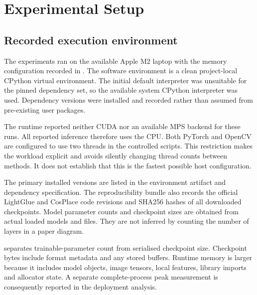 \chapter{Experimental Setup}\label{ch:setup}
\section{Recorded execution environment}
The experiments ran on the available Apple M2 laptop with the memory configuration recorded in . The software environment is a clean project-local CPython virtual environment. The initial default interpreter was unsuitable for the pinned dependency set, so the available system CPython interpreter was used. Dependency versions were installed and recorded rather than assumed from pre-existing user packages.

The runtime reported neither CUDA nor an available MPS backend for these runs. All reported inference therefore uses the CPU. Both PyTorch and OpenCV are configured to use two threads in the controlled scripts. This restriction makes the workload explicit and avoids silently changing thread counts between methods. It does not establish that this is the fastest possible host configuration.

The primary installed versions are listed in the environment artifact and dependency specification. The reproducibility bundle also records the official LightGlue and CosPlace code revisions and SHA256 hashes of all downloaded checkpoints. Model parameter counts and checkpoint sizes are obtained from actual loaded models and files. They are not inferred by counting the number of layers in a paper diagram.

 separates trainable-parameter count from serialised checkpoint size. Checkpoint bytes include format metadata and any stored buffers. Runtime memory is larger because it includes model objects, image tensors, local features, library imports and allocator state. A separate complete-process peak measurement is consequently reported in the deployment analysis.

